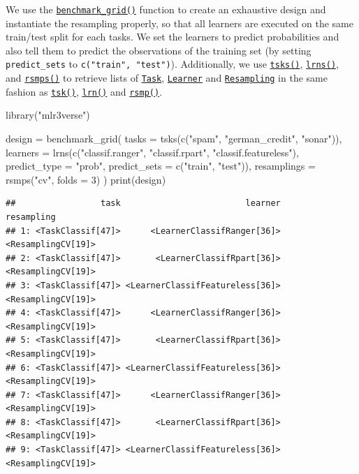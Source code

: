 \documentclass[
]{scrbook}
\newenvironment{Shaded}{\begin{snugshade}}{\end{snugshade}}
\newcommand{\AttributeTok}[1]{\textcolor[rgb]{0.77,0.63,0.00}{#1}}
\newcommand{\DecValTok}[1]{\textcolor[rgb]{0.00,0.00,0.81}{#1}}
\newcommand{\FunctionTok}[1]{\textcolor[rgb]{0.00,0.00,0.00}{#1}}
\newcommand{\NormalTok}[1]{#1}
\newcommand{\OtherTok}[1]{\textcolor[rgb]{0.56,0.35,0.01}{#1}}
\newcommand{\StringTok}[1]{\textcolor[rgb]{0.31,0.60,0.02}{#1}}
\renewenvironment{Shaded} {\begin{snugshade}\small} {\end{snugshade}}
\begin{document}
We use the \href{https://mlr3.mlr-org.com/reference/benchmark_grid.html}{\texttt{benchmark\_grid()}} function to create an exhaustive design and instantiate the resampling properly, so that all learners are executed on the same train/test split for each tasks.
We set the learners to predict probabilities and also tell them to predict the observations of the training set (by setting \texttt{predict\_sets} to \texttt{c("train",\ "test")}).
Additionally, we use \href{https://mlr3.mlr-org.com/reference/mlr_sugar.html}{\texttt{tsks()}}, \href{https://mlr3.mlr-org.com/reference/mlr_sugar.html}{\texttt{lrns()}}, and \href{https://mlr3.mlr-org.com/reference/mlr_sugar.html}{\texttt{rsmps()}} to retrieve lists of \href{https://mlr3.mlr-org.com/reference/Task.html}{\texttt{Task}}, \href{https://mlr3.mlr-org.com/reference/Learner.html}{\texttt{Learner}} and \href{https://mlr3.mlr-org.com/reference/Resampling.html}{\texttt{Resampling}} in the same fashion as \href{https://mlr3.mlr-org.com/reference/mlr_sugar.html}{\texttt{tsk()}}, \href{https://mlr3.mlr-org.com/reference/mlr_sugar.html}{\texttt{lrn()}} and \href{https://mlr3.mlr-org.com/reference/mlr_sugar.html}{\texttt{rsmp()}}.

\begin{Shaded}
\begin{Highlighting}[]
\FunctionTok{library}\NormalTok{(}\StringTok{"mlr3verse"}\NormalTok{)}

\NormalTok{design }\OtherTok{=} \FunctionTok{benchmark\_grid}\NormalTok{(}
  \AttributeTok{tasks =} \FunctionTok{tsks}\NormalTok{(}\FunctionTok{c}\NormalTok{(}\StringTok{"spam"}\NormalTok{, }\StringTok{"german\_credit"}\NormalTok{, }\StringTok{"sonar"}\NormalTok{)),}
  \AttributeTok{learners =} \FunctionTok{lrns}\NormalTok{(}\FunctionTok{c}\NormalTok{(}\StringTok{"classif.ranger"}\NormalTok{, }\StringTok{"classif.rpart"}\NormalTok{, }\StringTok{"classif.featureless"}\NormalTok{),}
    \AttributeTok{predict\_type =} \StringTok{"prob"}\NormalTok{, }\AttributeTok{predict\_sets =} \FunctionTok{c}\NormalTok{(}\StringTok{"train"}\NormalTok{, }\StringTok{"test"}\NormalTok{)),}
  \AttributeTok{resamplings =} \FunctionTok{rsmps}\NormalTok{(}\StringTok{"cv"}\NormalTok{, }\AttributeTok{folds =} \DecValTok{3}\NormalTok{)}
\NormalTok{)}
\FunctionTok{print}\NormalTok{(design)}
\end{Highlighting}
\end{Shaded}

\begin{verbatim}
##                 task                         learner         resampling
## 1: <TaskClassif[47]>      <LearnerClassifRanger[36]> <ResamplingCV[19]>
## 2: <TaskClassif[47]>       <LearnerClassifRpart[36]> <ResamplingCV[19]>
## 3: <TaskClassif[47]> <LearnerClassifFeatureless[36]> <ResamplingCV[19]>
## 4: <TaskClassif[47]>      <LearnerClassifRanger[36]> <ResamplingCV[19]>
## 5: <TaskClassif[47]>       <LearnerClassifRpart[36]> <ResamplingCV[19]>
## 6: <TaskClassif[47]> <LearnerClassifFeatureless[36]> <ResamplingCV[19]>
## 7: <TaskClassif[47]>      <LearnerClassifRanger[36]> <ResamplingCV[19]>
## 8: <TaskClassif[47]>       <LearnerClassifRpart[36]> <ResamplingCV[19]>
## 9: <TaskClassif[47]> <LearnerClassifFeatureless[36]> <ResamplingCV[19]>
\end{verbatim}
\end{document}
